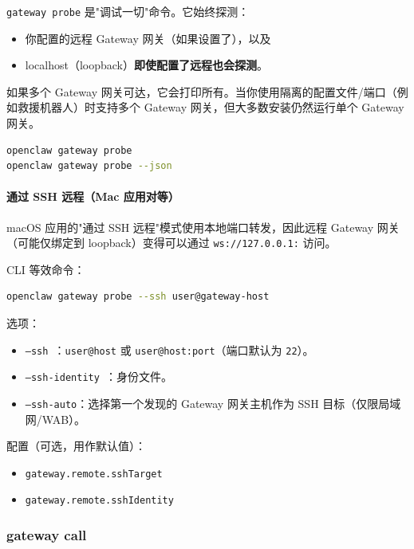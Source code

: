\texttt{gateway probe} 是"调试一切"命令。它始终探测：

\begin{itemize}
  \item 你配置的远程 Gateway 网关（如果设置了），以及
  \item localhost（loopback）\textbf{即使配置了远程也会探测}。
\end{itemize}


如果多个 Gateway 网关可达，它会打印所有。当你使用隔离的配置文件/端口（例如救援机器人）时支持多个 Gateway 网关，但大多数安装仍然运行单个 Gateway 网关。

\begin{lstlisting}[language=bash]
openclaw gateway probe
openclaw gateway probe --json
\end{lstlisting}


\paragraph{通过 SSH 远程（Mac 应用对等）}


macOS 应用的"通过 SSH 远程"模式使用本地端口转发，因此远程 Gateway 网关（可能仅绑定到 loopback）变得可以通过 \texttt{ws://127.0.0.1:} 访问。

CLI 等效命令：

\begin{lstlisting}[language=bash]
openclaw gateway probe --ssh user@gateway-host
\end{lstlisting}


选项：

\begin{itemize}
  \item \texttt{--ssh }：\texttt{user@host} 或 \texttt{user@host:port}（端口默认为 \texttt{22}）。
  \item \texttt{--ssh-identity }：身份文件。
  \item \texttt{--ssh-auto}：选择第一个发现的 Gateway 网关主机作为 SSH 目标（仅限局域网/WAB）。
\end{itemize}


配置（可选，用作默认值）：

\begin{itemize}
  \item \texttt{gateway.remote.sshTarget}
  \item \texttt{gateway.remote.sshIdentity}
\end{itemize}


\subsubsection{gateway call }


